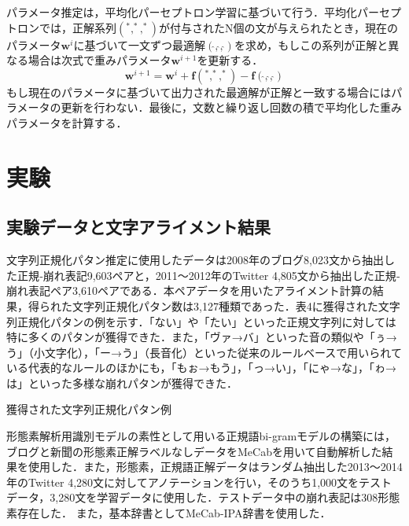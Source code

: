 \documentclass[japanese]{jnlp_1.4}
\def\vector#1{}
\begin{document}
パラメータ推定は，平均化パーセプトロン学習に基づいて行う．平均化パーセプトロンでは，正解系列$(\vector{w}^\ast, \vector{v}^\ast, \vector{t}^\ast)$が付与されたN個の文が与えられたとき，現在のパラメータ$\mathbf{w}^i$に基づいて一文ずつ最適解$(\hat{\vector{w}}, \hat{\vector{v}}, \hat{\vector{t}})$を求め，もしこの系列が正解と異なる場合は次式で重みパラメータ$\mathbf{w}^{i+1}$を更新する．
\begin{equation}
\mathbf{w}^{i+1} = \mathbf{w}^{i} + \mathbf{f}(\vector{w}^\ast, \vector{v}^\ast, \vector{t}^\ast) - \mathbf{f}(\hat{\vector{w}}, \hat{\vector{v}}, \hat{\vector{t}})
\end{equation}
もし現在のパラメータに基づいて出力された最適解が正解と一致する場合にはパラメータの更新を行わない．最後に，文数と繰り返し回数の積で平均化した重みパラメータを計算する．\cite{Collins:2002}


\section{実験}

\subsection{実験データと文字アライメント結果}
\label{sec:result}

文字列正規化パタン推定に使用したデータは2008年のブログ8,023文から抽出した正規‐崩れ表記9,603ペアと，2011〜2012年のTwitter 4,805文から抽出した正規‐崩れ表記ペア3,610ペアである．本ペアデータを用いたアライメント計算の結果，得られた文字列正規化パタン数は3,127種類であった．表4に獲得された文字列正規化パタンの例を示す．「ない」や「たい」といった正規文字列に対しては特に多くのパタンが獲得できた．また，「ヴァ→バ」といった音の類似や「ぅ→う」（小文字化），「ー→う」（長音化）といった従来のルールベースで用いられている代表的なルールのほかにも，「もぉ→もう」，「っ→い」，「にゃ→な」，「ゎ→は」といった多様な崩れパタンが獲得できた．

\begin{table}[t]
\caption{獲得された文字列正規化パタン例}
\label{tab:alignment}

\end{table}

形態素解析用識別モデルの素性として用いる正規語bi-gramモデルの構築には，ブログと新聞の形態素正解ラベルなしデータをMeCabを用いて自動解析した結果を使用した．また，形態素，正規語正解データはランダム抽出した2013〜2014年のTwitter 4,280文に対してアノテーションを行い，そのうち1,000文をテストデータ，3,280文を学習データに使用した．テストデータ中の崩れ表記は308形態素存在した．
また，基本辞書としてMeCab-IPA辞書を使用した．
\end{document}
